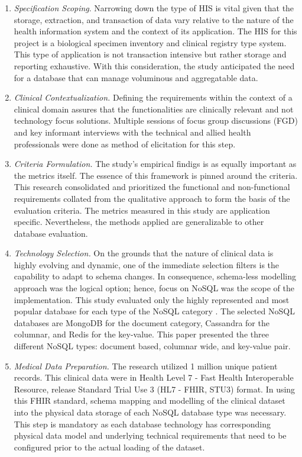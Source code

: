 \documentclass[5p]{elsarticle}
\begin{document}
\begin{enumerate}
\item \emph{Specification Scoping}. 
Narrowing down the type of HIS is vital given that the storage, extraction, and transaction of data vary relative to the nature of the health information system and the context of its application.
The HIS for this project is a biological specimen inventory and clinical registry type system. 
This type of application is not transaction intensive but rather storage and reporting exhaustive. 
With this consideration, the study anticipated the need for a database that can manage voluminous and aggregatable data.

\item \emph{Clinical Contextualization.} 
Defining the requirements within the context of a clinical domain assures that the functionalities are clinically relevant and not technology focus solutions.
Multiple sessions of focus group discussions (FGD) and key informant interviews with the technical and allied health professionals were done as method of elicitation for this step. 

\item \emph{Criteria Formulation.} 
The study's empirical findigs is as equally important as the metrics itself. The essence of this framework is pinned around the criteria.
This research consolidated and prioritized the functional and non-functional requirements collated from the qualitative approach to form the basis of the evaluation criteria.
The metrics measured in this study are application specific. Nevertheless, the methods applied are generalizable to other database evaluation.

\item \emph{Technology Selection.} 
On the grounds that the nature of clinical data is highly evolving and dynamic, one of the immediate selection filters is the capability to adapt to schema changes. In consequence, schema-less modelling approach was the logical option; hence, focus on NoSQL was the scope of the implementation. 
This study evaluated only the highly represented and most popular database for each type of the NoSQL category \cite{DBEnginesRanking2018}.
The selected NoSQL databases are MongoDB for the document category, Cassandra for the columnar, and Redis for the key-value.
This paper presented the three different NoSQL types: document based, columnar wide, and key-value pair.

\item \emph{Medical Data Preparation.} 
The research utilized 1 million unique patient records. 
This clinical data were in Health Level 7 - Fast Health Interoperable Resource, release Standard Trial Use 3 (HL7 - FHIR, STU3) format.
In using this FHIR standard, schema mapping and modelling of the clinical dataset into the physical data storage of each NoSQL database type was necessary.
This step is mandatory as each database technology has corresponding physical data model and underlying technical requirements that need to be configured prior to the actual loading of the dataset. 


\end{enumerate}
\end{document}
